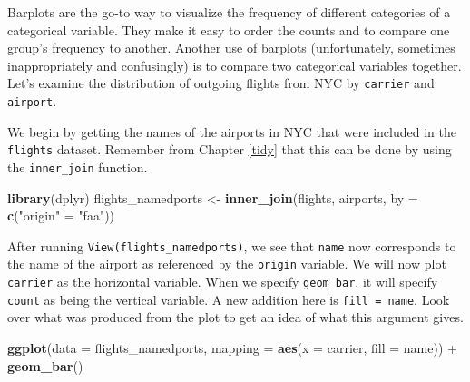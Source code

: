 \documentclass[]{tufte-book}
\newenvironment{Shaded}{\begin{snugshade}}{\end{snugshade}}
\newcommand{\KeywordTok}[1]{\textcolor[rgb]{0.13,0.29,0.53}{\textbf{{#1}}}}
\newcommand{\DataTypeTok}[1]{\textcolor[rgb]{0.13,0.29,0.53}{{#1}}}
\newcommand{\StringTok}[1]{\textcolor[rgb]{0.31,0.60,0.02}{{#1}}}
\newcommand{\NormalTok}[1]{{#1}}
\begin{document}
Barplots are the go-to way to visualize the frequency of different
categories of a categorical variable. They make it easy to order the
counts and to compare one group's frequency to another. Another use of
barplots (unfortunately, sometimes inappropriately and confusingly) is
to compare two categorical variables together. Let's examine the
distribution of outgoing flights from NYC by \texttt{carrier} and
\texttt{airport}.

We begin by getting the names of the airports in NYC that were included
in the \texttt{flights} dataset. Remember from Chapter \ref{tidy} that
this can be done by using the \texttt{inner\_join} function.

\begin{Shaded}
\begin{Highlighting}[]
\KeywordTok{library}\NormalTok{(dplyr)}
\NormalTok{flights_namedports <-}\StringTok{ }\KeywordTok{inner_join}\NormalTok{(flights, airports, }\DataTypeTok{by =} \KeywordTok{c}\NormalTok{(}\StringTok{"origin"} \NormalTok{=}\StringTok{ "faa"}\NormalTok{))}
\end{Highlighting}
\end{Shaded}

After running \texttt{View(flights\_namedports)}, we see that
\texttt{name} now corresponds to the name of the airport as referenced
by the \texttt{origin} variable. We will now plot \texttt{carrier} as
the horizontal variable. When we specify \texttt{geom\_bar}, it will
specify \texttt{count} as being the vertical variable. A new addition
here is \texttt{fill\ =\ name}. Look over what was produced from the
plot to get an idea of what this argument gives.

\begin{Shaded}
\begin{Highlighting}[]
\KeywordTok{ggplot}\NormalTok{(}\DataTypeTok{data =} \NormalTok{flights_namedports, }\DataTypeTok{mapping =} \KeywordTok{aes}\NormalTok{(}\DataTypeTok{x =} \NormalTok{carrier, }\DataTypeTok{fill =} \NormalTok{name)) +}
\StringTok{  }\KeywordTok{geom_bar}\NormalTok{()}
\end{Highlighting}
\end{Shaded}
\end{document}
